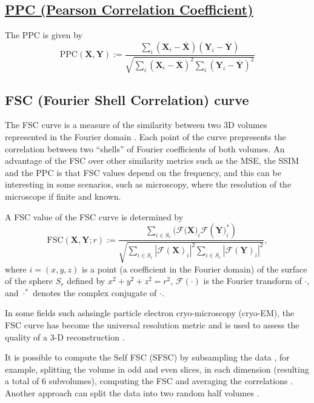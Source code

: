 \documentclass{article}
\begin{document}
\subsection{\href{https://en.wikipedia.org/wiki/Pearson_correlation_coefficient}{PPC
    (Pearson Correlation Coefficient)}}
The PPC is given by
\begin{equation}
  \text{PPC}(\mathbf{X}, \mathbf{Y}) := \frac{\sum_i(\mathbf{X}_i - \overline{\mathbf{X}})(\mathbf{Y}_i - \overline{\mathbf{Y}})}{\sqrt{\sum_i (\mathbf{X}_i - \overline{\mathbf{X}})^2 \sum_i (\mathbf{Y}_i - \overline{\mathbf{Y}})^2}}
\end{equation}

\subsection{FSC (Fourier Shell Correlation) curve}
The FSC curve is a measure of the similarity between two 3D volumes
represented in the Fourier domain \cite{verbeke2024self}. Each point
of the curve prepresents the correlation between two ``shells'' of
Fourier coefficients of both volumes. An advantage of the FSC over
other similarity metrics such as the MSE, the SSIM and the PPC is that
FSC values depend on the frequency, and this can be interesting in
some scenarios, such as microscopy, where the resolution of the
microscope if finite and known.

A FSC value of the FSC curve is determined by~\cite{verbeke2024self}
\begin{equation}
\text{FSC}(\mathbf{X}, \mathbf{Y}; r) := \frac{\sum_{i \in S_r} (\mathcal{F}(\mathbf{X)}_i \mathcal{F}(\mathbf{Y)}_i^*)}{\sqrt{\sum_{i \in S_r} |\mathcal{F}(\mathbf{X})_i|^2 \sum_{i \in S_r} |\mathcal{F}(\mathbf{Y})_i|^2}},
\end{equation}
where $i=(x, y, z)$ is a point (a coefficient in the Fourier domain)
of the surface of the sphere $S_r$ defined by $x^2+y^2+z^2=r^2$,
$\mathcal{F}(\cdot)$ is the Fourier transform of $\cdot$, and
$\cdot^*$ denotes the complex conjugate of $\cdot$.

In some fields such ashsingle particle electron cryo-microscopy
(cryo-EM), the FSC curve has become the universal resolution metric
and is used to assess the quality of a 3-D reconstruction
\cite{rosenthal2003optimal,scheres2012prevention}.

It is possible to compute the Self FSC (SFSC) by subsampling the data
\cite{koho2019fourier}, for example, splitting the volume in odd and
even slices, in each dimension (resulting a total of 6 subvolumes),
computing the FSC and averaging the correlations
\cite{verbeke2024self}. Another approach can split the data into two
random half volumes \cite{verbeke2024self}.
\end{document}
